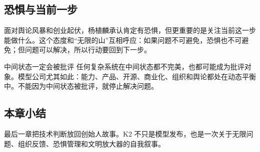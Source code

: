 \subsection{恐惧与当前一步}

面对舆论风暴和创业起伏，杨植麟承认肯定有恐惧，但更重要的是关注当前这一步能做什么。这个态度和“无限的山”互相呼应：如果问题不可避免，恐惧也不可避免；但问题可以解决，所以行动要回到下一步。

\begin{warningbox}{中间状态一定会被批评}
任何复杂系统在中间状态都不完美，也都可能成为批评对象。模型公司尤其如此：能力、产品、开源、商业化、组织和舆论都处在动态平衡中。不能因为中间状态被批评，就停止解决问题。
\end{warningbox}

\subsection{本章小结}

最后一章把技术判断放回创始人故事。K2 不只是模型发布，也是一次关于无限问题、组织反馈、恐惧管理和文明放大器的自我叙事。

